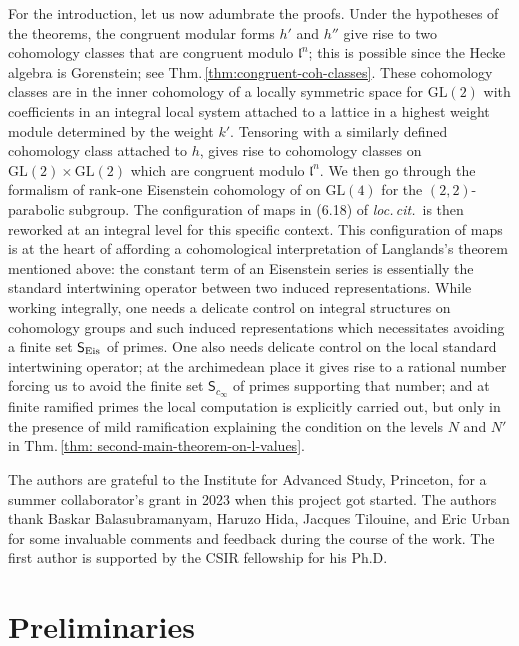 \documentclass[11pt]{amsart}
\newcommand{\GL}{\mathrm{GL}}
\begin{document}
For the introduction, let us now adumbrate the proofs. 
Under the hypotheses of the theorems, the congruent modular forms $h'$ and $h''$ give rise to 
two cohomology classes that are congruent modulo $\mathfrak{l}^n$; this is possible since 
the Hecke algebra is Gorenstein; see Thm.\,\ref{thm:congruent-coh-classes}. These cohomology classes are in the inner cohomology of a locally symmetric space for 
$\GL(2)$ with coefficients in an integral local system attached to a lattice in a highest weight module determined by the weight $k'$. 
Tensoring with a similarly defined cohomology class attached to $h$, gives rise to cohomology classes on $\GL(2) \times \GL(2)$
which are congruent modulo $\mathfrak{l}^n$. We then go through the formalism of rank-one 
Eisenstein cohomology of \cite{harder-raghuram} on $\GL(4)$ for the $(2,2)$-parabolic subgroup. 
The configuration of maps in (6.18) of {\it loc.\,cit.}\ is then reworked at an integral level for this specific context. 
This configuration of maps is at the heart of affording a cohomological interpretation of Langlands's theorem mentioned above: 
the constant term of an Eisenstein series is essentially the standard intertwining operator between two induced representations. 
While working integrally, one needs a delicate control on integral structures on cohomology groups and such induced representations 
which necessitates avoiding a finite set $\mathsf{S}_{\textup{Eis}}$ of primes. One also needs delicate control on the local standard 
intertwining operator; at the archimedean place it gives rise to a rational number forcing us to avoid the finite set $\mathsf{S}_{c_{\infty}}$ of primes 
supporting that number;  
and at finite ramified primes the local computation is explicitly carried out, but only in the presence of mild ramification 
explaining the condition on the levels $N$ and $N'$ in Thm.\,\ref{thm: second-main-theorem-on-l-values}. 


\medskip

{\Small {} 
The authors are grateful to the Institute for Advanced Study, Princeton, for a summer collaborator's grant in 2023 when this project got started. 
The authors thank Baskar Balasubramanyam, Haruzo Hida, Jacques Tilouine, and Eric Urban for some invaluable comments and feedback 
during the course of the work. The first author is supported by the CSIR fellowship for his Ph.D.}

\medskip

\section{Preliminaries}
 
\end{document}

